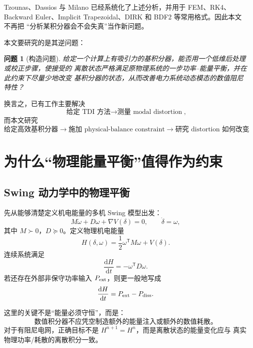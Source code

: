\documentclass[UTF8,11pt,a4paper]{ctexart}
\newtheorem{problem}{问题}
\newcommand{\T}{\mathsf{T}}
\begin{document}
Tzounas、Dassios 与 Milano 已经系统化了上述分析，并用于 FEM、RK4、Backward
Euler、Implicit Trapezoidal、DIRK 和 BDF2 等常用格式。因此本文不再把
“分析某积分器会不会失真”当作新问题。

本文要研究的是其逆问题：

\begin{problem}[构造问题]
给定一个计算上有吸引力的基积分器，能否用一个低维后处理或校正步骤，使接受的
离散状态严格满足原物理系统的一步功率--能量平衡，并在此约束下尽量少地改变
基积分器的状态，从而改善电力系统动态模态的数值阻尼特性？
\end{problem}

换言之，已有工作主要解决
\[
  \boxed{\text{给定 TDI 方法} \longrightarrow \text{测量 modal distortion}},
\]
而本文研究
\[
  \boxed{\text{给定高效基积分器} \longrightarrow
  \text{施加 physical-balance constraint} \longrightarrow
  \text{研究 distortion 如何改变}}.
\]

\section{为什么“物理能量平衡”值得作为约束}

\subsection{Swing 动力学中的物理平衡}

先从能够清楚定义机电能量的多机 Swing 模型出发：
\begin{equation}
  M\dot\omega+D\omega+\nabla V(\delta)=0,
  \qquad
  \dot\delta=\omega,
  \label{eq:swing}
\end{equation}
其中 \(M\succ0\)，\(D\succeq0\)。定义物理机电能量
\begin{equation}
  H(\delta,\omega)
  =
  \frac12\omega^\T M\omega+V(\delta).
  \label{eq:energy}
\end{equation}
连续系统满足
\begin{equation}
  \frac{\mathrm d H}{\mathrm dt}
  =
  -\omega^\T D\omega.
  \label{eq:physical-balance}
\end{equation}
若还存在外部非保守功率输入 \(P_{\rm ext}\)，则更一般地写成
\begin{equation}
  \frac{\mathrm d H}{\mathrm dt}
  =
  P_{\rm ext}-P_{\rm diss}.
  \label{eq:general-balance}
\end{equation}

这里的关键不是“能量必须守恒”，而是：
\[
  \boxed{
  \text{数值积分器不应凭空制造额外的能量注入或额外的数值耗散。}
  }
\]
对于有阻尼电网，正确目标不是 \(H^{n+1}=H^n\)，而是离散状态的能量变化应与
真实物理功率/耗散的离散积分一致。
\end{document}
